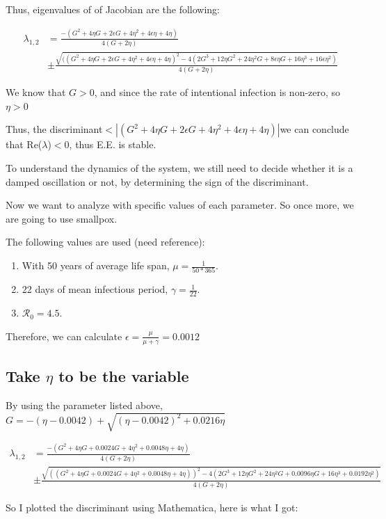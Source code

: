 \documentclass[12pt]{article}
\newcommand{\R}{\mathcal{R}}
\begin{document}
Thus, eigenvalues of of Jacobian are the following:

\begin{align}
\lambda_{1,2} &= \frac{-(G^2+4\eta G+2\epsilon G+4\eta^2+4\epsilon\eta+4\eta) }{4(G+2\eta)}\\
& \pm \frac{\sqrt{((G^2+4\eta G+2\epsilon G+4\eta^2+4\epsilon\eta+4\eta)^2-4(2G^3+12\eta G^2+24\eta^2 G+8\epsilon\eta G+16\eta^3+16\epsilon\eta^2)}}{4(G+2\eta)}
\end{align}

We know that $G>0$, and since the rate of intentional infection is non-zero, so $\eta >0$

Thus, the discriminant$<|(G^2+4\eta G+2\epsilon G+4\eta^2+4\epsilon\eta+4\eta)|$we can conclude that Re($\lambda$)$<0$, thus E.E. is stable.

To understand the dynamics of the system, we still need to decide whether it is a damped oscillation or not, by determining the sign of the discriminant.

Now we want to analyze with specific values of each parameter. So once more, we are going to use smallpox.

The following values are used (need reference): 
\begin{enumerate}
\item With 50 years of average life span, $\mu=\frac{1}{50*365}$.
\item 22 days of mean infectious period, $\gamma=\frac{1}{22}$.
\item $\R_0=4.5$.
\end{enumerate}
Therefore, we can calculate $\epsilon=\frac{\mu}{\mu+\gamma}=0.0012$

\subsection{Take $\eta$ to be the variable}

By using the parameter listed above, $G=-(\eta-0.0042)+\sqrt{(\eta-0.0042)^2+0.0216\eta}$

\begin{align}
\lambda_{1,2} &= \frac{-(G^2+4\eta G+0.0024 G+4\eta^2+0.0048\eta+4\eta) }{4(G+2\eta)}\\
& \pm \frac{\sqrt{((G^2+4\eta G+0.0024 G+4\eta^2+0.0048\eta+4\eta))^2-4(2G^3+12\eta G^2+24\eta^2 G+0.0096\eta G+16\eta^3+0.0192\eta^2)}}{4(G+2\eta)}
\end{align}

So I plotted the discriminant using Mathematica, here is what I got:
\end{document}
